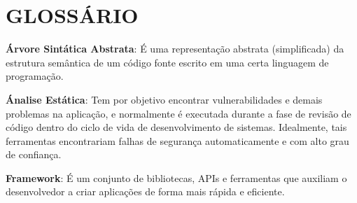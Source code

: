 



\chapter*{GLOSSÁRIO}

{ \setlength{\parindent}{0pt} %

\textbf{Árvore Sintática Abstrata}: É uma representação abstrata (simplificada) da estrutura semântica de um código fonte escrito em uma certa linguagem de programação.

\textbf{Ánalise Estática}: Tem por objetivo encontrar vulnerabilidades e demais problemas na aplicação, e normalmente é executada durante a fase de revisão de código dentro do ciclo de vida de desenvolvimento de sistemas. Idealmente, tais ferramentas encontrariam falhas de segurança automaticamente e com alto grau de confiança.

\textbf{Framework}: É um conjunto de bibliotecas, APIs e ferramentas que auxiliam o desenvolvedor a criar aplicações de forma mais rápida e eficiente.

} %
